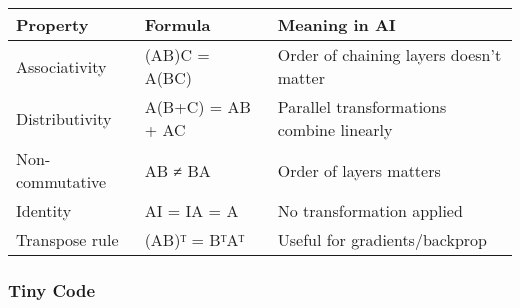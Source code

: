 \documentclass[
  letterpaper,
  DIV=11,
  numbers=noendperiod]{scrreprt}
\begin{document}
\begin{longtable}[]{@{}
  >{\raggedright\arraybackslash}p{}
  >{\raggedright\arraybackslash}p{}
  >{\raggedright\arraybackslash}p{}@{}}
\toprule\noalign{}
\begin{minipage}[b]{\linewidth}\raggedright
Property
\end{minipage} & \begin{minipage}[b]{\linewidth}\raggedright
Formula
\end{minipage} & \begin{minipage}[b]{\linewidth}\raggedright
Meaning in AI
\end{minipage} \\
\midrule\noalign{}
\endhead
\bottomrule\noalign{}
\endlastfoot
Associativity & (AB)C = A(BC) & Order of chaining layers doesn't
matter \\
Distributivity & A(B+C) = AB + AC & Parallel transformations combine
linearly \\
Non-commutative & AB ≠ BA & Order of layers matters \\
Identity & AI = IA = A & No transformation applied \\
Transpose rule & (AB)ᵀ = BᵀAᵀ & Useful for gradients/backprop \\
\end{longtable}

\subsubsection{Tiny Code}\label{tiny-code-102}
\end{document}
